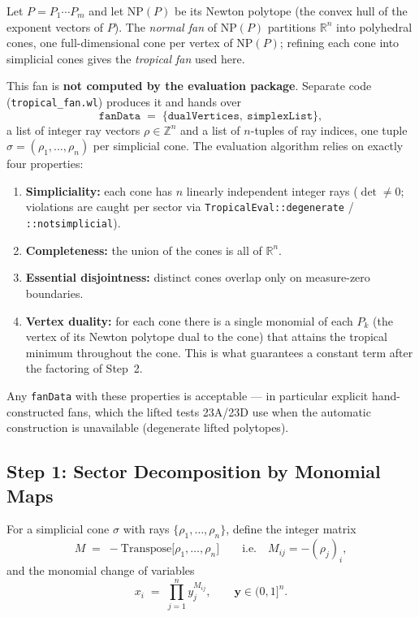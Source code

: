 \documentclass[11pt,a4paper]{article}
\begin{document}
Let $P = P_1 \cdots P_m$ and let $\mathrm{NP}(P)$ be its Newton polytope (the
convex hull of the exponent vectors of $P$). The \emph{normal fan} of
$\mathrm{NP}(P)$ partitions $\mathbb{R}^n$ into polyhedral cones, one
full-dimensional cone per vertex of $\mathrm{NP}(P)$; refining each cone into
simplicial cones gives the \emph{tropical fan} used here.

This fan is \textbf{not computed by the evaluation package}. Separate code
(\texttt{tropical\_fan.wl}) produces it and hands over
\begin{equation*}
\texttt{fanData} \;=\; \{\texttt{dualVertices},\ \texttt{simplexList}\},
\end{equation*}
a list of integer ray vectors $\rho \in \mathbb{Z}^n$ and a list of
$n$-tuples of ray indices, one tuple $\sigma = (\rho_1, \ldots, \rho_n)$ per
simplicial cone. The evaluation algorithm relies on exactly four properties:

\begin{enumerate}
  \item \textbf{Simpliciality:} each cone has $n$ linearly independent integer
        rays ($\det \neq 0$; violations are caught per sector via
        \texttt{TropicalEval::degenerate} / \texttt{::notsimplicial}).
  \item \textbf{Completeness:} the union of the cones is all of
        $\mathbb{R}^n$.
  \item \textbf{Essential disjointness:} distinct cones overlap only on
        measure-zero boundaries.
  \item \textbf{Vertex duality:} for each cone there is a single monomial of
        each $P_k$ (the vertex of its Newton polytope dual to the cone) that
        attains the tropical minimum throughout the cone. This is what
        guarantees a constant term after the factoring of
        Step~2.
\end{enumerate}

Any \texttt{fanData} with these properties is acceptable --- in particular
explicit hand-constructed fans, which the lifted tests 23A/23D use when the
automatic construction is unavailable (degenerate lifted polytopes).

\subsection{Step 1: Sector Decomposition by Monomial Maps}\label{sec:alg-sectors}

For a simplicial cone $\sigma$ with rays $\{\rho_1, \ldots, \rho_n\}$, define
the integer matrix
\begin{equation}
M \;=\; -\mathrm{Transpose}\bigl[\rho_1, \ldots, \rho_n\bigr]
\qquad\text{i.e.}\quad M_{ij} = -(\rho_j)_i ,
\end{equation}
and the monomial change of variables
\begin{equation}\label{eq:alg-cov}
x_i \;=\; \prod_{j=1}^{n} y_j^{M_{ij}}, \qquad \mathbf{y} \in (0,1]^n .
\end{equation}
\end{document}

